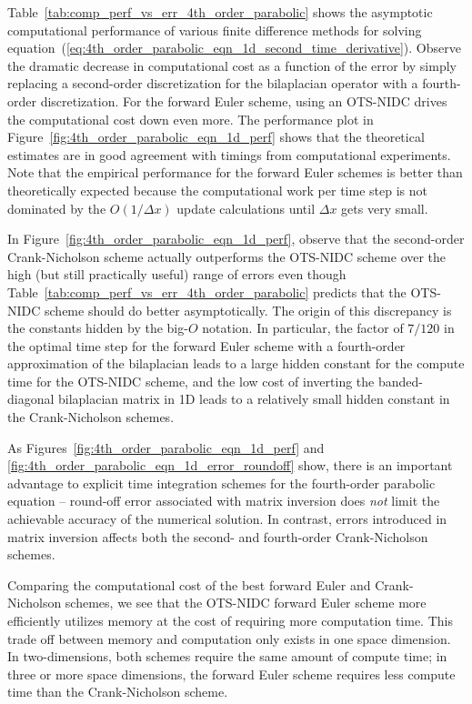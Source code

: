 \documentclass[fleqn,12pt,twoside]{article}
\def\dx{\Delta x}
\begin{document}
Table~\ref{tab:comp_perf_vs_err_4th_order_parabolic} shows the asymptotic
computational performance of various finite difference methods for solving 
equation~(\ref{eq:4th_order_parabolic_eqn_1d_second_time_derivative}).
Observe the dramatic decrease in computational cost as a function of the
error by simply replacing a second-order discretization for the bilaplacian 
operator with a fourth-order discretization.  For the forward Euler scheme,
using an OTS-NIDC drives the computational cost down even more.
The performance plot in Figure~\ref{fig:4th_order_parabolic_eqn_1d_perf} 
shows that the theoretical estimates are in good agreement with timings 
from computational experiments.  Note that the empirical performance for the 
forward Euler schemes is better than theoretically expected because the 
computational work per time step is not dominated by the 
$O(1/\dx)$ update calculations until $\dx$ gets very small.

In Figure~\ref{fig:4th_order_parabolic_eqn_1d_perf}, observe that the 
second-order Crank-Nicholson scheme actually outperforms the OTS-NIDC scheme
over the high (but still practically useful) range of errors even though 
Table~\ref{tab:comp_perf_vs_err_4th_order_parabolic} predicts that the OTS-NIDC
scheme should do better asymptotically.  The origin of this discrepancy is the
constants hidden by the big-$O$ notation.  In particular, the factor of $7/120$
in the optimal time step for the forward Euler scheme with a fourth-order 
approximation of the bilaplacian leads to a large hidden constant 
for the compute time for the OTS-NIDC scheme, and the low cost of inverting
the banded-diagonal bilaplacian matrix in 1D leads to a relatively small hidden
constant in the Crank-Nicholson schemes.

As Figures~\ref{fig:4th_order_parabolic_eqn_1d_perf} and
\ref{fig:4th_order_parabolic_eqn_1d_error_roundoff} show, there is an
important advantage to explicit time integration schemes for the fourth-order
parabolic equation -- round-off error associated with matrix inversion does 
\emph{not} limit the achievable accuracy of the numerical solution.  In 
contrast, errors introduced in matrix inversion affects both the second- and
fourth-order Crank-Nicholson schemes. 

Comparing the computational cost of the best forward Euler and Crank-Nicholson 
schemes, we see that the OTS-NIDC forward Euler scheme more efficiently 
utilizes memory at the cost of requiring more computation time.  This trade off 
between memory and computation only exists in one space dimension.  In 
two-dimensions, both schemes require the same amount of compute time; in three 
or more space dimensions, the forward Euler scheme requires less compute time 
than the Crank-Nicholson scheme.  
\end{document}
